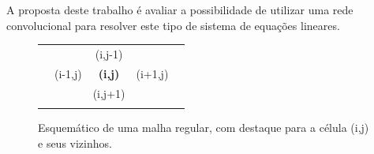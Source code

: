 \documentclass[final,5p]{elsarticle}
\numberwithin{equation}{section}
\begin{document}
    A proposta deste trabalho é avaliar a possibilidade de utilizar uma rede convolucional para resolver este tipo de sistema de equações lineares.

    \begin{figure}
    \begin{center}
        \begin{tabular}{c|c|c|c|c}
            & &  & & \\
            \hline
            & & (i,j-1) & & \\
            \hline
            & (i-1,j) & \textbf{(i,j)} & (i+1,j) & \\
            \hline
            & & (i,j+1) & & \\
            \hline
            & &  & & \\
        \end{tabular}
        \caption{Esquemático de uma malha regular, com destaque para a célula (i,j) e seus vizinhos.}
        \label{fig:esquematico}
    \end{center}
    \end{figure}
\end{document}

